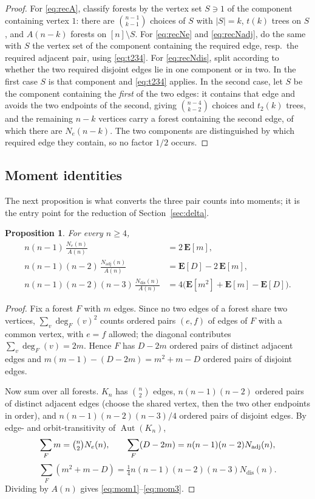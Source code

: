\documentclass[11pt,a4paper]{amsart}
\theoremstyle{plain}
\newtheorem{proposition}[theorem]{Proposition}
\theoremstyle{definition}
\newcommand{\EX}{\mathbf{E}}
\newcommand{\dg}{\operatorname{deg}}
\newcommand{\Nc}{N}
\begin{document}
\begin{proof}
For \eqref{eq:recA}, classify forests by the vertex set $S \ni 1$ of the
component containing vertex $1$: there are $\binom{n-1}{k-1}$ choices of $S$ with
$|S|=k$, $t(k)$ trees on $S$, and $A(n-k)$ forests on $[n]\setminus S$.
For \eqref{eq:recNe} and \eqref{eq:recNadj}, do the same with $S$ the vertex set
of the component containing the required edge, resp.\ the required adjacent pair,
using \eqref{eq:t234}. For \eqref{eq:recNdis}, split according to whether the two
required disjoint edges lie in one component or in two. In the first case $S$ is
that component and \eqref{eq:t234} applies. In the second case, let $S$ be the
component containing the \emph{first} of the two edges: it contains that edge and
avoids the two endpoints of the second, giving $\binom{n-4}{k-2}$ choices and
$t_2(k)$ trees, and the remaining $n-k$ vertices carry a forest containing the
second edge, of which there are $\Nc_e(n-k)$. The two components are
distinguished by which required edge they contain, so no factor $1/2$ occurs.
\end{proof}

\subsection{Moment identities}

The next proposition is what converts the three pair counts into moments; it is
the entry point for the reduction of Section~\ref{sec:delta}.

\begin{proposition}\label{prop:moments}
For every $n \ge 4$,
\begin{align}
  n(n-1)\,\frac{\Nc_e(n)}{A(n)} &= 2\,\EX[m], \label{eq:mom1}\\
  n(n-1)(n-2)\,\frac{\Nc_{\mathrm{adj}}(n)}{A(n)} &= \EX[D]-2\,\EX[m], \label{eq:mom2}\\
  n(n-1)(n-2)(n-3)\,\frac{\Nc_{\mathrm{dis}}(n)}{A(n)}
    &= 4\big(\EX[m^2]+\EX[m]-\EX[D]\big). \label{eq:mom3}
\end{align}
\end{proposition}

\begin{proof}
Fix a forest $F$ with $m$ edges. Since no two edges of a forest share two
vertices, $\sum_v \dg_F(v)^2$ counts ordered pairs $(e,f)$ of edges of $F$ with a
common vertex, with $e=f$ allowed; the diagonal contributes $\sum_v \dg_F(v)=2m$.
Hence $F$ has $D-2m$ ordered pairs of distinct adjacent edges and
$m(m-1)-(D-2m) = m^2+m-D$ ordered pairs of disjoint edges.

Now sum over all forests. $K_n$ has $\binom{n}{2}$ edges, $n(n-1)(n-2)$ ordered
pairs of distinct adjacent edges (choose the shared vertex, then the two other
endpoints in order), and $n(n-1)(n-2)(n-3)/4$ ordered pairs of disjoint edges.
By edge- and orbit-transitivity of $\operatorname{Aut}(K_n)$,
\[
  \sum_F m = \tbinom{n}{2}\Nc_e(n),\qquad
  \sum_F (D-2m) = n(n-1)(n-2)\Nc_{\mathrm{adj}}(n),
\]
\[
  \sum_F (m^2+m-D) = \tfrac{1}{4}n(n-1)(n-2)(n-3)\Nc_{\mathrm{dis}}(n).
\]
Dividing by $A(n)$ gives \eqref{eq:mom1}--\eqref{eq:mom3}.
\end{proof}
\end{document}
